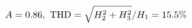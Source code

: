 \documentclass[preview]{standalone}
\begin{document}
\begin{align*}
\special{dvisvgm:raw <g id='unique000'>}A=0.86,\ \text{THD}=\sqrt{H_2^2+H_3^2}/H_1=15.5\%\special{dvisvgm:raw </g>}
\end{align*}
\end{document}
